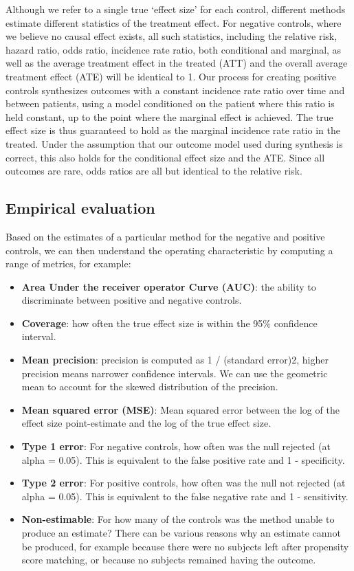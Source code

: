 \documentclass[11pt]{book}
\providecommand{\tightlist}{%
  \setlength{\itemsep}{0pt}\setlength{\parskip}{0pt}}
\begin{document}
Although we refer to a single true `effect size' for each control,
different methods estimate different statistics of the treatment effect.
For negative controls, where we believe no causal effect exists, all
such statistics, including the relative risk, hazard ratio, odds ratio,
incidence rate ratio, both conditional and marginal, as well as the
average treatment effect in the treated (ATT) and the overall average
treatment effect (ATE) will be identical to 1. Our process for creating
positive controls synthesizes outcomes with a constant incidence rate
ratio over time and between patients, using a model conditioned on the
patient where this ratio is held constant, up to the point where the
marginal effect is achieved. The true effect size is thus guaranteed to
hold as the marginal incidence rate ratio in the treated. Under the
assumption that our outcome model used during synthesis is correct, this
also holds for the conditional effect size and the ATE. Since all
outcomes are rare, odds ratios are all but identical to the relative
risk.

\subsection{Empirical evaluation}\label{empirical-evaluation}

Based on the estimates of a particular method for the negative and
positive controls, we can then understand the operating characteristic
by computing a range of metrics, for example:

\begin{itemize}
\tightlist
\item
  \textbf{Area Under the receiver operator Curve (AUC)}: the ability to
  discriminate between positive and negative controls.
\item
  \textbf{Coverage}: how often the true effect size is within the 95\%
  confidence interval.
\item
  \textbf{Mean precision}: precision is computed as 1 / (standard
  error)2, higher precision means narrower confidence intervals. We can
  use the geometric mean to account for the skewed distribution of the
  precision.
\item
  \textbf{Mean squared error (MSE)}: Mean squared error between the log
  of the effect size point-estimate and the log of the true effect size.
\item
  \textbf{Type 1 error}: For negative controls, how often was the null
  rejected (at alpha = 0.05). This is equivalent to the false positive
  rate and 1 - specificity.
\item
  \textbf{Type 2 error}: For positive controls, how often was the null
  not rejected (at alpha = 0.05). This is equivalent to the false
  negative rate and 1 - sensitivity.
\item
  \textbf{Non-estimable}: For how many of the controls was the method
  unable to produce an estimate? There can be various reasons why an
  estimate cannot be produced, for example because there were no
  subjects left after propensity score matching, or because no subjects
  remained having the outcome.
\end{itemize}
\end{document}
